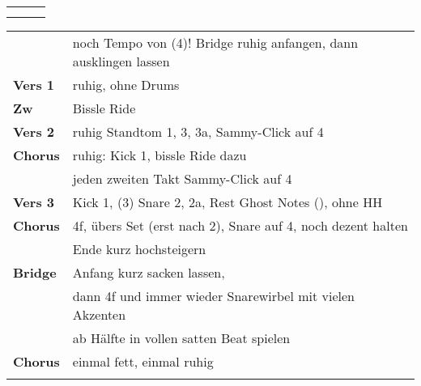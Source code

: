 

\begin{tabular}{p{0.6cm}p{12cm}p{1.4cm}}
	\rowcolor{cyan} \myRow{\thesongnumber} & \myRow{Gotteslamm} & \myRow{70} \\
	                                       &                    &            \\
\end{tabular}

\begin{tabular}{p{1.6cm}l}
	                & \color{red} noch Tempo von (4)! Bridge ruhig anfangen, dann ausklingen lassen \\
	\textbf{Vers 1} & ruhig, ohne Drums                                                             \\
	\textbf{Zw}     & Bissle Ride                                                                   \\
	\textbf{Vers 2} & ruhig Standtom 1, 3, 3a, Sammy-Click auf 4                                    \\
	\textbf{Chorus} & ruhig: Kick 1, bissle Ride dazu                                               \\
	                & jeden zweiten Takt Sammy-Click auf 4                                          \\
	\textbf{Vers 3} & Kick 1, (3) Snare 2, 2a, Rest Ghost Notes (\sechzehntel), ohne HH             \\
	\textbf{Chorus} & 4f, übers Set (erst nach 2), Snare auf 4, noch dezent halten                  \\
	                & Ende kurz \achtel hochsteigern                                                \\
	\textbf{Bridge} & Anfang kurz sacken lassen,                                                    \\ %
	                & dann 4f und immer wieder Snarewirbel mit vielen Akzenten                      \\ %
	                & ab Hälfte in vollen satten Beat spielen                                       \\ %
	\textbf{Chorus} & einmal fett, einmal ruhig                                                     \\ %
	                &                                                                               \\
\end{tabular}
